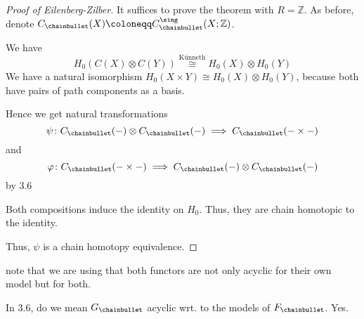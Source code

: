 \begin{proof}[Proof of Eilenberg-Zilber]
  It suffices to prove the theorem with $R = \mathbb{Z}$.
  As before, denote $C_{\chainbullet}(X) \coloneqq C_{\chainbullet}^{\sing}(X ; \mathbb{Z})$.

  We have
  \[
    H_0(C(X) \otimes C(Y))
    \stackrel{\text{Künneth}}{\cong}
    H_0(X) \otimes H_0(Y)
  \]
  We have a natural isomorphism
  $H_0(X \times Y) \cong H_0(X) \otimes H_0(Y)$,
  because both have pairs of path components as a basis.

  Hence we get natural transformations
  \[
    \psi \colon  C_{\chainbullet}(\blank) \otimes C_{\chainbullet}(\blank) \implies C_{\chainbullet}( \blank \times  \blank )
  \]
  and
  \[
  \varphi  \colon  C_{\chainbullet}( \blank \times  \blank ) \implies C_{\chainbullet} ( \blank ) \otimes  C_{\chainbullet} ( \blank )
  \]
  by 3.6

  Both compositions induce the identity on $H_0$.
  Thus, they are chain homotopic to the identity.

  Thus, $\psi $ is a chain homotopy equivalence.
\end{proof}

\begin{oral}
  note that we are using that both functors are not
  only acyclic for their own model but for both.
\end{oral}

\begin{question}
  In 3.6, do we mean $G_{\chainbullet}$ acyclic wrt. to the models of  $F_{\chainbullet}$.
  Yes.
\end{question}

